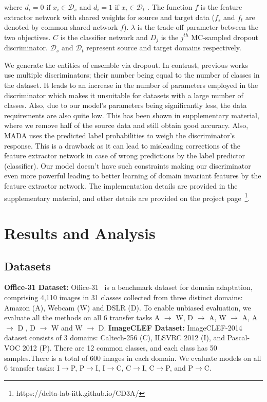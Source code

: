 \documentclass{bmvc2k}
\begin{document}
where $ d_i=0$ $\text{if $x_i \in \mathcal{D}_s $}$ and $ d_i=1$ $\text{if $x_i \in \mathcal{D}_t $}$ . The function $f$ is the feature extractor network with shared weights for source and target data ($f_s$ and $f_t$ are denoted by common shared network $f$). $\lambda$ is the trade-off parameter between the two objectives. $C$ is the classifier network and $D_j$ is the $j^{th}$ MC-sampled dropout discriminator. $\mathcal{D}_s$ and $\mathcal{D}_t$ represent source and target domains respectively.

We generate the entities of ensemble via dropout. In contrast, previous works~\cite{pei_arxiv2018} use multiple discriminators; their number being equal to the number of classes in the dataset. It leads to an increase in the number of parameters employed in the discriminator which makes it unsuitable for datasets with a large number of classes. Also, due to our model's parameters being significantly less, the data requirements are also quite low. This has been shown in supplementary material, where we remove half of the source data and still obtain good accuracy. Also, MADA uses the predicted label probabilities to weigh the discriminator's response. This is a drawback as it can lead to misleading corrections of the feature extractor network in case of wrong predictions by the label predictor (classifier). Our model doesn't have such constraints making our discriminator even more powerful leading to better learning of domain invariant features by the feature extractor network. 
The implementation details are provided in the supplementary material, and other details are provided on the project page~\footnote{https://delta-lab-iitk.github.io/CD3A/}.











\section{ Results and Analysis}
\subsection{Datasets}
 \textbf{{Office-31 Dataset:}}
Office-31~\cite{saenko_ECCV2010} is a benchmark dataset for domain adaptation, comprising 4,110 images in 31 classes collected from three distinct domains: Amazon (A), Webcam (W) and DSLR (D). To enable unbiased evaluation, we evaluate all the methods on all 6 transfer tasks A $\rightarrow$ W, D $\rightarrow$ A, W $\rightarrow$ A, A $\rightarrow$ D , D $\rightarrow$ W and W $\rightarrow$ D.
\newline
\textbf{{ImageCLEF Dataset:}}
ImageCLEF-2014 dataset consists of 3 domains: Caltech-256 (C), ILSVRC 2012 (I), and Pascal-VOC 2012 (P). There are 12 common classes, and each class has 50 samples.There is a total of 600 images in each domain. We evaluate models on all 6 transfer tasks: I$\rightarrow$P, P$\rightarrow$I, I$\rightarrow$C, C$\rightarrow$I, C$\rightarrow$P, and P$\rightarrow$C. 
\end{document}
